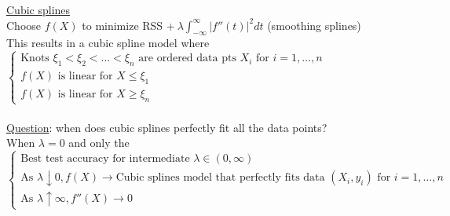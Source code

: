 \documentclass[12pt, letterpaper]{article}
\begin{document}
\underline{Cubic splines} \\
Choose $f(X)$ to minimize RSS +$\ \lambda\int_{-\infty}^{\infty}|f''(t)|^2dt$ (smoothing splines) \\
This results in a cubic spline model where \\
$\begin{cases}
    \text{Knots } \xi_1 < \xi_2 < \dots < \xi_n \text{ are ordered data pts } X_i \text{ for } i = 1,\dots, n \\
    f(X) \text{ is linear for } X \le \xi_1 \\
    f(X) \text{ is linear for } X \ge \xi_n
\end{cases}$ \\ \\
\underline{Question}: when does cubic splines perfectly fit all the data points? \\
When $\lambda = 0$ and only the \\
$\begin{cases}
    \text{Best test accuracy for intermediate } \lambda \in (0,\infty) \\
    \text{As } \lambda \downarrow 0, f(X) \rightarrow \text{Cubic splines model that perfectly fits data }(X_i, y_i) \text{ for } i = 1,\dots,n \\
    \text{As } \lambda \uparrow \infty, f''(X) \rightarrow 0
\end{cases}$
\end{document}
